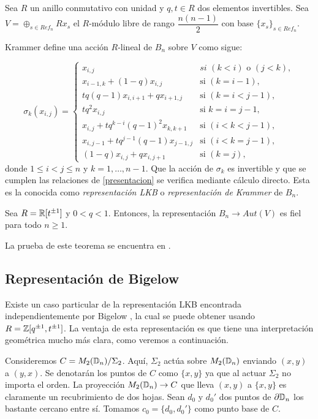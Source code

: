 \documentclass[TFG.tex]{subfiles}
\begin{document}
Sea $R$ un anillo conmutativo con unidad y $q,t\in R$ dos elementos invertibles. Sea $V=\oplus_{s\in Ref_n}Rx_s$ el $R$-módulo libre de rango $\dfrac{n(n-1)}{2}$ con base $\{x_s\}_{s\in Ref_n}$. 

Krammer \cite{Krammer} define una acción $R$-lineal de $B_n$ sobre $V$ como sigue:


\begin{equation}\label{LKB}
\sigma_k(x_{i,j})=\begin{cases}
x_{i,j} & \textit{si }(k<i)\text{ o }(j<k),\\
x_{i-1,k}+(1-q)x_{i,j} & \text{si } (k=i-1),\\
tq(q-1)x_{i,i+1}+qx_{i+1,j} & \text{si }(k=i<j-1),\\
tq^2x_{i,j} & \text{si }k=i=j-1,\\
x_{i,j}+tq^{k-i}(q-1)^2x_{k,k+1} & \text{si }(i<k<j-1),\\
x_{i,j-1}+tq^{j-1}(q-1)x_{j-1,j} & \text{si }(i<k=j-1),\\
(1-q)x_{i,j}+qx_{i,j+1} & \text{si }(k=j),
\end{cases}
\end{equation}
donde $1\leq i<j\leq n$ y $k=1,\dots, n-1$. Que la acción de $\sigma_k$ es invertible y que se cumplen las relaciones de \ref{presentacion} se verifica mediante cálculo directo. Esta es la conocida como \emph{representación LKB} o \emph{representación de Krammer} de $B_n$.


\begin{teorema}
Sea $R=\mathbb{R}[t^{\pm 1}]$ y $0<q<1$. Entonces, la representación $B_n\to Aut(V)$ es fiel para todo $n\geq 1$.
\end{teorema}

La prueba de este teorema se encuentra en \cite{Krammer}.


\subsection{Representación de Bigelow}
Existe un caso particular de la representación LKB encontrada independientemente por Bigelow \cite{Bil}, la cual se puede obtener usando $R=\mathbb{Z}[q^{\pm 1},t^{\pm 1}]$. La ventaja de esta representación es que tiene una interpretación geométrica mucho más clara, como veremos a continuación.

Consideremos $C=M_2(\mathbb{D}_n)/\Sigma_2$. Aquí, $\Sigma_2$ actúa sobre $M_2(\mathbb{D}_n)$ enviando $(x,y)$ a $(y,x)$. Se denotarán los puntos de $C$ como $\{x,y\}$ ya que al actuar $\Sigma_2$ no importa el orden. La proyección $M_2(\mathbb{D}_n)\to C$ que lleva $(x,y)$ a $\{x,y\}$ es claramente un recubrimiento de dos hojas. Sean $d_0$ y $d_0'$ dos puntos de $\partial\mathbb{D}_n$ los bastante cercano entre sí. Tomamos $c_0=\{d_0,d_0'\}$ como punto base de $C$.
\end{document}
